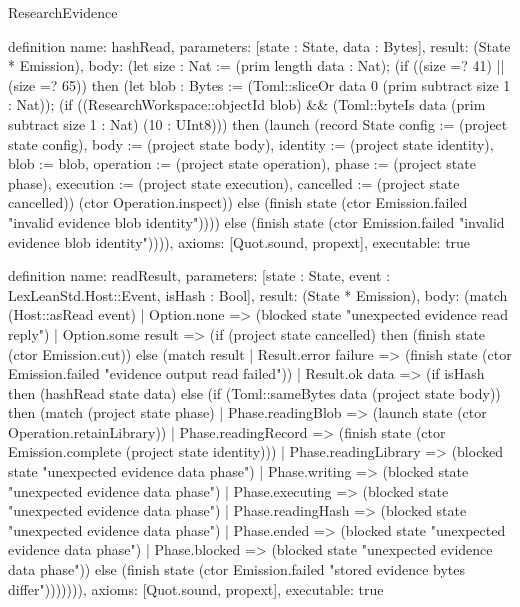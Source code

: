 \begin{lexlean}{ResearchEvidence}
\begin{semanticmodule}
definition{
 name: hashRead,
 parameters: [state : State, data : Bytes],
 result: (State * Emission),
 body: (let size : Nat := (prim length data : Nat); (if ((size =? 41) || (size =? 65)) then (let blob : Bytes := (Toml::sliceOr data 0 (prim subtract size 1 : Nat)); (if ((ResearchWorkspace::objectId blob) && (Toml::byteIs data (prim subtract size 1 : Nat) (10 : UInt8))) then (launch (record State {config := (project state config), body := (project state body), identity := (project state identity), blob := blob, operation := (project state operation), phase := (project state phase), execution := (project state execution), cancelled := (project state cancelled)}) (ctor Operation.inspect)) else (finish state (ctor Emission.failed "invalid evidence blob identity")))) else (finish state (ctor Emission.failed "invalid evidence blob identity")))),
 axioms: [Quot.sound, propext],
 executable: true
}

definition{
 name: readResult,
 parameters: [state : State, event : LexLeanStd.Host::Event, isHash : Bool],
 result: (State * Emission),
 body: (match (Host::asRead event) | Option.none => (blocked state "unexpected evidence read reply") | Option.some result => (if (project state cancelled) then (finish state (ctor Emission.cut)) else (match result | Result.error failure => (finish state (ctor Emission.failed "evidence output read failed")) | Result.ok data => (if isHash then (hashRead state data) else (if (Toml::sameBytes data (project state body)) then (match (project state phase) | Phase.readingBlob => (launch state (ctor Operation.retainLibrary)) | Phase.readingRecord => (finish state (ctor Emission.complete (project state identity))) | Phase.readingLibrary => (blocked state "unexpected evidence data phase") | Phase.writing => (blocked state "unexpected evidence data phase") | Phase.executing => (blocked state "unexpected evidence data phase") | Phase.readingHash => (blocked state "unexpected evidence data phase") | Phase.ended => (blocked state "unexpected evidence data phase") | Phase.blocked => (blocked state "unexpected evidence data phase")) else (finish state (ctor Emission.failed "stored evidence bytes differ"))))))),
 axioms: [Quot.sound, propext],
 executable: true
}


\end{semanticmodule}
\end{lexlean}
